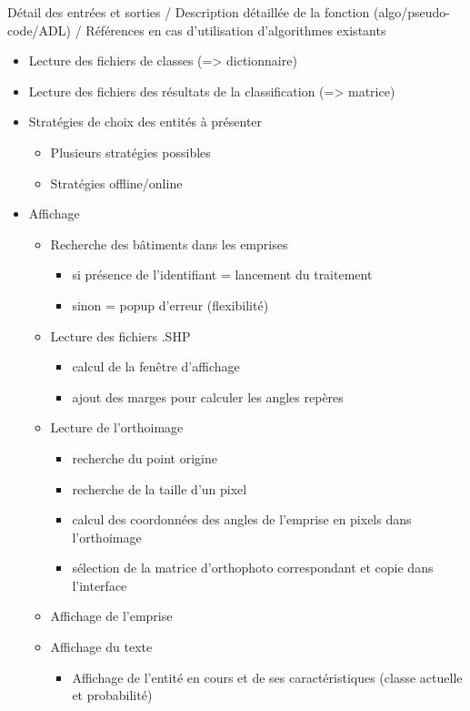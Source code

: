 Détail des entrées et sorties / Description détaillée de la fonction (algo/pseudo-code/ADL) / Références en cas d'utilisation d'algorithmes existants\newline

\begin{itemize}
	\item Lecture des fichiers de classes (=> dictionnaire)
	\item Lecture des fichiers des résultats de la classification (=> matrice)
	\item Stratégies de choix des entités à présenter
	\begin{itemize}
		\item Plusieurs stratégies possibles
		\item Stratégies offline/online
	\end{itemize}
	\item Affichage
	\begin{itemize}
		\item Recherche des bâtiments dans les emprises
		\begin{itemize}
			\item si présence de l'identifiant = lancement du traitement
			\item sinon = popup d'erreur (flexibilité)
		\end{itemize}
		\item Lecture des fichiers .SHP
		\begin{itemize}
			\item calcul de la fenêtre d'affichage
			\item ajout des marges pour calculer les angles repères
		\end{itemize}
		\item Lecture de l'orthoimage
		\begin{itemize}
			\item recherche du point origine
			\item recherche de la taille d'un pixel
			\item calcul des coordonnées des angles de l'emprise en pixels dans l'orthoimage
			\item sélection de la matrice d'orthophoto correspondant et copie dans l'interface
		\end{itemize}
		\item Affichage de l'emprise
		\item Affichage du texte
		\begin{itemize}
			\item Affichage de l'entité en cours et de ses caractéristiques (classe actuelle et probabilité)

\end{itemize}
\end{itemize}
\end{itemize}
